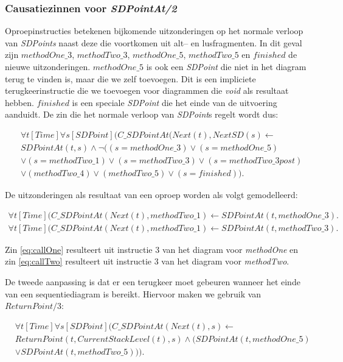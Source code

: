 \subsubsection{Causatiezinnen voor \textit{SDPointAt/2}}\label{sec:sd-rec-cause}
Oproepinstructies betekenen bijkomende uitzonderingen op het normale verloop van \textit{SDPoints} naast deze die voortkomen uit alt-- en lusfragmenten. In dit geval zijn $methodOne\_3$, $methodTwo\_3$, $methodOne\_5$, $methodTwo\_5$ en $finished$ de nieuwe uitzonderingen. $methodOne\_5$ is ook een \textit{SDPoint} die niet in het diagram terug te vinden is, maar die we zelf toevoegen. Dit is een impliciete terugkeerinstructie die we toevoegen voor diagrammen die \textit{void} als resultaat hebben. $finished$ is een speciale \textit{SDPoint} die het einde van de uitvoering aanduidt. De zin die het normale verloop van \textit{SDPoint}s regelt wordt dus:

\begin{align}
	& \nonumber \forall{t}[Time]\forall{s}[SDPoint](C\_SDPointAt(Next(t), NextSD(s) \leftarrow \\ \nonumber &SDPointAt(t,s) \land \lnot((s = methodOne\_3) \lor (s = methodOne\_5) \\ \nonumber &\lor (s = methodTwo\_1) \lor (s = methodTwo\_3) \lor (s = methodTwo\_3post) \\ &\lor (methodTwo\_4) \lor (methodTwo\_5) \lor (s = finished)).
\end{align}

De uitzonderingen als resultaat van een oproep worden als volgt gemodelleerd:

\begin{align}
	 \forall{t}[Time](C\_SDPointAt(Next(t), methodTwo\_1) \leftarrow SDPointAt(t, methodOne\_3).\label{eq:callOne} \\
	 \forall{t}[Time](C\_SDPointAt(Next(t), methodTwo\_1) \leftarrow SDPointAt(t, methodTwo\_3).\label{eq:callTwo}
\end{align}

Zin \ref{eq:callOne} resulteert uit instructie 3 van het diagram voor \textit{methodOne} en zin \ref{eq:callTwo} resulteert uit instructie 3 van het diagram voor \textit{methodTwo}.

De tweede aanpassing is dat er een terugkeer moet gebeuren wanneer het einde van een sequentiediagram is bereikt. Hiervoor maken we gebruik van $ReturnPoint/3$:

\begin{align}
	&\nonumber \forall{t}[Time]\forall{s}[SDPoint](C\_SDPointAt(Next(t), s) \leftarrow \\ \nonumber &ReturnPoint(t, CurrentStackLevel(t), s) \land (SDPointAt(t, methodOne\_5) \\ &\lor SDPointAt(t, methodTwo\_5))).\label{eq:sd-return}
\end{align}

